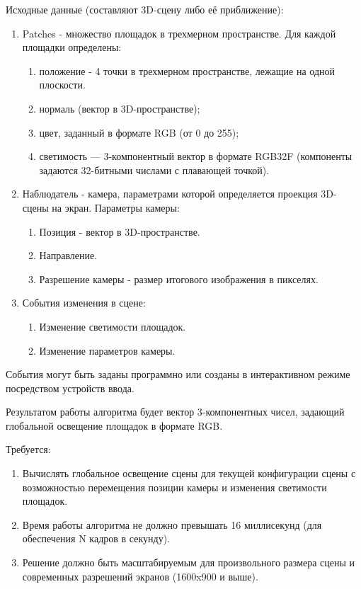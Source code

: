 \documentclass[oneside,final,12pt, a4paper]{extreport}
\begin{document}
Исходные данные (составляют 3D-сцену либо её приближение):

\begin{enumerate}
	\item Patches - множество площадок в трехмерном пространстве. Для каждой площадки определены: 
	\begin{enumerate}
		\item положение - 4 точки в трехмерном пространстве, лежащие на одной плоскости.
		\item нормаль (вектор в 3D-пространстве);
		\item цвет, заданный в формате RGB (от 0 до 255);
		\item светимость --- 3-компонентный вектор в формате RGB32F (компоненты задаются 32-битными числами с плавающей точкой).
	\end{enumerate}
	\item Наблюдатель - камера, параметрами которой определяется проекция 3D-сцены на экран. Параметры камеры:
	\begin{enumerate}
		\item Позиция - вектор в 3D-пространстве.
		\item Направление.
		\item Разрешение камеры - размер итогового изображения в пикселях.
	\end{enumerate}
	\item События изменения в сцене:
	\begin{enumerate}
		\item Изменение светимости площадок.
		\item Изменение параметров камеры.
	\end{enumerate}
\end{enumerate}

События могут быть заданы программно или созданы в интерактивном режиме посредством устройств ввода.

Результатом работы алгоритма будет вектор 3-компонентных чисел, задающий глобальной освещение площадок в формате RGB.

Требуется:
\begin{enumerate}
	\item Вычислять глобальное освещение сцены для текущей конфигурации сцены с возможностью перемещения позиции камеры и изменения светимости площадок. 
	\item Время работы алгоритма не должно превышать 16 миллисекунд (для обеспечения N кадров в секунду). 
	\item Решение должно быть масштабируемым для произвольного размера сцены и современных разрешений экранов (1600x900 и выше).
\end{enumerate}
\end{document}

